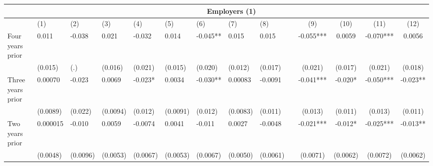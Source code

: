 \begin{tabular}{lccccrrrrrcccc}
\toprule
      & \multicolumn{13}{c}{Employers (1)} \\
\midrule
      & \multicolumn{1}{l}{(1)} & \multicolumn{1}{l}{(2)} & \multicolumn{1}{l}{(3)} & \multicolumn{1}{l}{(4)} & \multicolumn{1}{l}{(5)} & \multicolumn{1}{l}{(6)} & \multicolumn{1}{l}{(7)} & \multicolumn{1}{l}{(8)} &       & (9)   & (10)  & (11)  & (12) \\
\midrule
\midrule
Four years prior & \multicolumn{1}{l}{0.011} & \multicolumn{1}{l}{-0.038} & \multicolumn{1}{l}{0.021} & \multicolumn{1}{l}{-0.032} & \multicolumn{1}{l}{0.014} & \multicolumn{1}{l}{-0.045**} & \multicolumn{1}{l}{0.015} & \multicolumn{1}{l}{0.015} &       & -0.055*** & 0.0059 & -0.070*** & 0.0056 \\
      & \multicolumn{1}{l}{(0.015)} & \multicolumn{1}{l}{(.)} & \multicolumn{1}{l}{(0.016)} & \multicolumn{1}{l}{(0.021)} & \multicolumn{1}{l}{(0.015)} & \multicolumn{1}{l}{(0.020)} & \multicolumn{1}{l}{(0.012)} & \multicolumn{1}{l}{(0.017)} &       & (0.021) & (0.017) & (0.021) & (0.018) \\
Three years prior & \multicolumn{1}{l}{0.00070} & \multicolumn{1}{l}{-0.023} & \multicolumn{1}{l}{0.0069} & \multicolumn{1}{l}{-0.023*} & \multicolumn{1}{l}{0.0034} & \multicolumn{1}{l}{-0.030**} & \multicolumn{1}{l}{0.00083} & \multicolumn{1}{l}{-0.0091} &       & -0.041*** & -0.020* & -0.050*** & -0.023** \\
      & \multicolumn{1}{l}{(0.0089)} & \multicolumn{1}{l}{(0.022)} & \multicolumn{1}{l}{(0.0094)} & \multicolumn{1}{l}{(0.012)} & \multicolumn{1}{l}{(0.0091)} & \multicolumn{1}{l}{(0.012)} & \multicolumn{1}{l}{(0.0083)} & \multicolumn{1}{l}{(0.011)} &       & (0.013) & (0.011) & (0.013) & (0.011) \\
Two years prior & \multicolumn{1}{l}{0.000015} & \multicolumn{1}{l}{-0.010} & \multicolumn{1}{l}{0.0059} & \multicolumn{1}{l}{-0.0074} & \multicolumn{1}{l}{0.0041} & \multicolumn{1}{l}{-0.011} & \multicolumn{1}{l}{0.0027} & \multicolumn{1}{l}{-0.0048} &       & -0.021*** & -0.012* & -0.025*** & -0.013** \\
      & \multicolumn{1}{l}{(0.0048)} & \multicolumn{1}{l}{(0.0096)} & \multicolumn{1}{l}{(0.0053)} & \multicolumn{1}{l}{(0.0067)} & \multicolumn{1}{l}{(0.0053)} & \multicolumn{1}{l}{(0.0067)} & \multicolumn{1}{l}{(0.0050)} & \multicolumn{1}{l}{(0.0061)} &       & (0.0071) & (0.0062) & (0.0072) & (0.0062) \\

\end{tabular}
